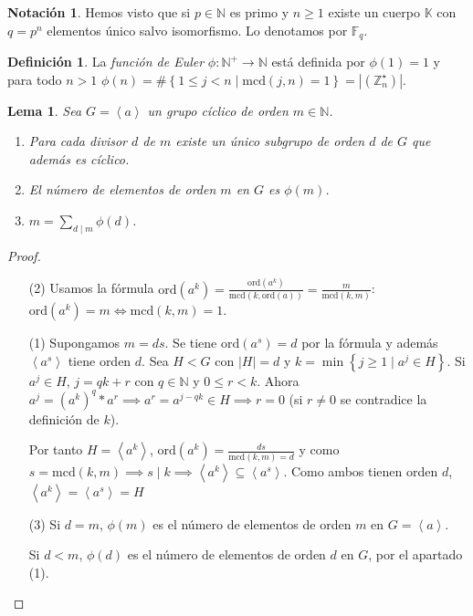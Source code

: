 \documentclass[10pt, spanish]{report}
\newtheorem{lema}[tma]{Lema}
\theoremstyle{definition}
\newtheorem*{defin}{Definición}
\newtheorem*{notacion}{Notación}
\theoremstyle{custom}
\theoremstyle{remark}
\newcommand{\N}{\mathbb{N}}
\newcommand{\Z}{\mathbb{Z}}
\newcommand{\F}{\mathbb{F}}
\newcommand{\K}{\mathbb{K}}
\newcommand{\ord}[1]{\text{ord}(#1)}
\newcommand{\mcd}[1]{\text{mcd}(#1)}
\renewcommand{\geq}{\geqslant}
\renewcommand{\leq}{\leqslant}
\newcommand{\fecha}[1]{\marginpar{\underline{\footnotesize{#1}}}}
\begin{document}
\fecha{16/03} %

\begin{notacion}
    Hemos visto que si $p\in\N$  es primo y $n\geq1$ existe un cuerpo $\K$ con
    $q=p^n$ elementos único salvo isomorfismo. Lo denotamos por $\F_q$.
\end{notacion}

\begin{defin}
    La \textit{función de Euler} $\phi:\N^+\to\N$ está definida por $\phi(1)=1$
    y para todo $n>1$ $\phi(n)=\#\left\{1\leq j<n\mid \mcd{j,n}=1\right\}=
    \left| \left( \Z_n^\star \right)\right|$.
\end{defin}

\begin{lema}\label{lema:propsgruposciclicos}
    Sea $G=\left< a \right> $  un grupo cíclico de orden $m\in\N$.
    \begin{enumerate}
        \item  Para cada divisor $d$ de $m$ existe un único subgrupo de orden
            $d$ de $G$ que además es cíclico.
        \item El número de elementos de orden $m$ en $G$ es $\phi(m)$.
        \item $m=\sum_{d\mid m}\phi(d)$.
    \end{enumerate}
\end{lema}

\begin{proof}\hspace{0pt}
    \begin{enumerate}
        \item[(2)] Usamos la fórmula
            $\ord{a^k}=\frac{\ord{a^k}}{\mcd{k,\ord{a}}}=
            \frac{m}{\mcd{k,m}}$: $\ord{a^k}=m\Leftrightarrow\mcd{k,m}=1$.
            \item[(1)] Supongamos $m=ds$. Se tiene $\ord{a^s}=d$ por la fórmula
                y además $\left< a^s \right> $ tiene orden $d$.
                Sea $H<G$ con $\left|H\right|=d$ y $k=\min\left\{ j\geq1\mid
                a^j\in H \right\}$. Si $a^j\in H$, $j=qk+r$ con $q\in\N$ y
                $0\leq r<k$. Ahora $a^j=(a^k)^q*a^r\implies a^r=a^{j-qk}\in
                H\implies r=0$ (si $r\neq0$ se contradice la definición de
                $k$).

                Por tanto $H= \left< a^k \right>$,
                $\ord{a^k}=\frac{ds}{\mcd{k,m}=d}$ y como $s=\mcd{k,m}\implies
                s\mid k\implies \left<a^k\right>\subseteq \left< a^s\right>$.
                Como ambos tienen orden $d$, $\left<a^k\right>=\left<a^s\right> =H$
            \item[(3)] Si $d=m$, $\phi(m)$ es el número de elementos de orden
                $m$ en $G=\left<a\right>$.

                Si $d<m$, $\phi(d)$ es el número de elementos de orden $d$ en
                $G$, por el apartado (1).
    \end{enumerate}
    \vspace{-1.75em}
\end{proof}
\end{document}
